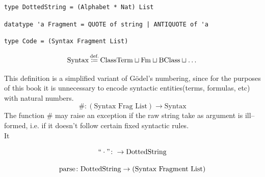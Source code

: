 

\begin{lstlisting}
type DottedString = (Alphabet * Nat) List
\end{lstlisting}

\begin{lstlisting}
datatype 'a Fragment = QUOTE of string | ANTIQUOTE of 'a
\end{lstlisting}

\begin{lstlisting}
type Code = (Syntax Fragment List)
\end{lstlisting}

\begin{metadefinition}[syntax]
\[
\text{Syntax} \eqdef \ClassTerm \sqcup \Fm \sqcup \BClass \sqcup \dots
\]
\end{metadefinition}

\begin{metadefinition}
This definition is a simplified variant of G\"odel's numbering, since for the purposes of this book it is unnecessary to encode syntactic entities(terms, formulas, etc) with natural numbers.
\[
\# : (\text{Syntax Frag List}) \to \text{Syntax}
\]
The function $\#$ may raise an exception if the raw string take as argument is ill--formed, i.e. if it doesn't follow certain fixed syntactic rules.\\
It 
\end{metadefinition}
\[
`` \cdot " \: \to \text{DottedString} 
\]

\[
\myparse \: \text{DottedString} \to \text{(Syntax Fragment List)}
\]


